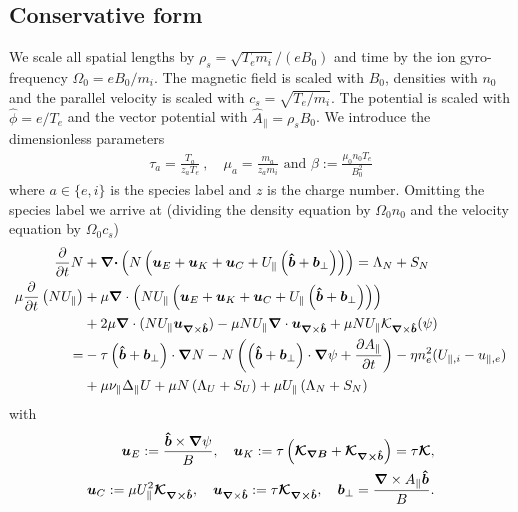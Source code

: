 \subsection{Conservative form}
We scale all spatial lengths by $\rho_s = \sqrt{T_e m_i}/(eB_0)$ and time by the ion gyro-frequency $\Omega_0 = eB_0/m_i$.
The magnetic field is scaled with $B_0$, densities with $n_0$ and the parallel velocity is scaled with $c_s = \sqrt{T_e/m_i}$.
The potential is scaled with $\hat \phi = e/T_e$ and the vector potential with
$\hat A_\parallel = \rho_s B_0$.
We introduce the dimensionless parameters
\begin{align}
  \tau_a = \frac{T_a}{z_aT_e}~,\quad \mu_a = \frac{m_a}{z_am_i}\text{ and }
  \beta:=\frac{\mu_0 n_0 T_e}{B_0^2}
  \label{}
\end{align}
where $a\in\{e,i\}$ is the species label and $z$ is the charge number.
Omitting the species label we arrive at (dividing the density equation by $\Omega_0n_0$ and the velocity equation by $\Omega_0 c_s$)
\begin{align}
\frac{\partial}{\partial t} N &+ {\boldsymbol{{\boldsymbol{\nabla}}\cdot}}\left( N \left(
    {\boldsymbol{u}}_E + {\boldsymbol{u}}_K + {\boldsymbol{u}}_{C} + U_\parallel\left(\bm{\hat{b}} + {{\boldsymbol{b}}}_\perp\right)\right)\right) = \Lambda_N + S_N \\
    \mu \frac{\partial}{\partial t} \left(N U_\parallel\right) &+ \mu {\boldsymbol{\nabla}}\cdot \left( NU_\parallel \left(
    {\boldsymbol{u}}_E + {\boldsymbol{u}}_K + {\boldsymbol{u}}_{C} + U_\parallel\left(\bm{\hat{b}} + {{\boldsymbol{b}}}_\perp\right)
    \right)\right)  \nonumber \\
    &+ 2\mu {\boldsymbol{\nabla}}\cdot ( NU_\parallel {\boldsymbol{u}}_{{\boldsymbol{\nabla}}\times\bm{\hat{b}}})
    -\mu NU_\parallel{\boldsymbol{\nabla}}\cdot {\boldsymbol{u}}_{{\boldsymbol{\nabla}}\times\bm{\hat{b}}}
    + \mu NU_\parallel\mathcal K_{{\boldsymbol{\nabla}}\times\bm{\hat{b}}}(\psi) \nonumber\\
    =& -\tau \left(\bm{\hat{b}} + {{\boldsymbol{b}}}_\perp\right)\cdot{\boldsymbol{\nabla}} N
    -N \left( \left(\bm{\hat{b}}+{{\boldsymbol{b}}}_\perp\right)\cdot{\boldsymbol{\nabla}} \psi + \frac{\partial A_\parallel}{\partial t}\right)
    - \eta n_e^2(U_{\parallel,i}-u_{\parallel,e}) 
    \nonumber\\
    &+ \mu \nu_\parallel \Delta_\parallel U+ \mu N\left(\Lambda_U + S_U\right) + \mu U_\parallel \left(\Lambda_N + S_N\right)
\label{}
\end{align}
with
\begin{align}
{\boldsymbol{u}}_E := \frac{\bm{\hat{b}}\times{\boldsymbol{\nabla}}\psi}{B},\quad
{\boldsymbol{u}}_{K} := \tau \left({\boldsymbol{\mathcal K_{{\boldsymbol{\nabla}} B}}} + {\boldsymbol{\mathcal K_{{\boldsymbol{\nabla}}\times\bm{\hat{b}}}}}\right)=\tau{\boldsymbol{\mathcal K}}  ,\nonumber\\
{\boldsymbol{u}}_C := \mu U_\parallel^2{\boldsymbol{\mathcal K_{{\boldsymbol{\nabla}}\times\bm{\hat{b}}}}},\quad
{\boldsymbol{u}}_{{\boldsymbol{\nabla}}\times\bm{\hat{b}}} := \tau{\boldsymbol{\mathcal K_{{\boldsymbol{\nabla}}\times\bm{\hat{b}}}}},\quad
{{\boldsymbol{b}}}_\perp = \frac{{\boldsymbol{\nabla}}\times A_\parallel \bm{\hat{b}}}{B}.
\label{}
\end{align}

